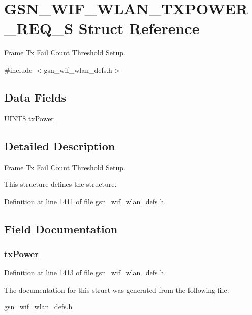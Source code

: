 \hypertarget{a00411}{
\section{GSN\_\-WIF\_\-WLAN\_\-TXPOWER\_\-REQ\_\-S Struct Reference}
\label{a00411}
}


Frame Tx Fail Count Threshold Setup.  




{\ttfamily \#include $<$gsn\_\-wif\_\-wlan\_\-defs.h$>$}

\subsection*{Data Fields}
\begin{DoxyCompactItemize}
\item 
\hyperlink{a00660_gab27e9918b538ce9d8ca692479b375b6a}{UINT8} \hyperlink{a00411_a763a8a049f451428e05835d3c3b466cd}{txPower}
\end{DoxyCompactItemize}


\subsection{Detailed Description}
Frame Tx Fail Count Threshold Setup. 

This structure defines the structure. 

Definition at line 1411 of file gsn\_\-wif\_\-wlan\_\-defs.h.



\subsection{Field Documentation}
\hypertarget{a00411_a763a8a049f451428e05835d3c3b466cd}{
\subsubsection[{txPower}]{ {\bf txPower}}}
\label{a00411_a763a8a049f451428e05835d3c3b466cd}


Definition at line 1413 of file gsn\_\-wif\_\-wlan\_\-defs.h.



The documentation for this struct was generated from the following file:\begin{DoxyCompactItemize}
\item 
\hyperlink{a00613}{gsn\_\-wif\_\-wlan\_\-defs.h}\end{DoxyCompactItemize}
